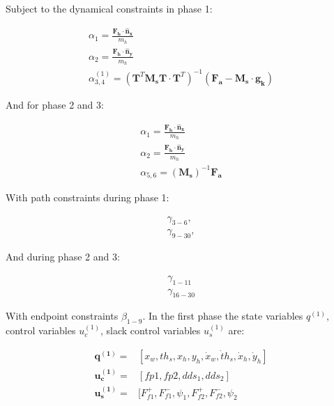 \documentclass[default,iicol]{sn-jnl}
\theoremstyle{thmstyleone}%
\theoremstyle{thmstyletwo}%
\theoremstyle{thmstylethree}%
\begin{document}
Subject to the dynamical constraints in phase 1:

\begin{equation}
\begin{array}{c}
        \alpha_{1} = \frac{\mathbf{F_h}\cdot \mathbf{\hat n_x}}{m_h}\\
        \alpha_{2} = \frac{\mathbf{F_h}\cdot \mathbf{\hat n_y}}{m_h}\\
        \alpha_{3,4}^{(1)} =   \left(\mathbf{T}^T \mathbf{M_s} \mathbf{T} \cdot  \mathbf{T}^T\right)^{-1} (\mathbf{F_a} - \mathbf{M_s} \cdot \mathbf{g_k})
\end{array}
\end{equation}

And for phase 2 and 3:

\begin{equation}
    \begin{array}{c}
        \alpha_{1} = \frac{\mathbf{F_h}\cdot \mathbf{\hat n_x}}{m_h}\\
        \alpha_{2} = \frac{\mathbf{F_h}\cdot \mathbf{\hat n_y}}{m_h}\\ 
        \alpha_{5,6} = (\mathbf{M_s})^{-1}\mathbf{F_a}
    \end{array}
\end{equation}

With path constraints during phase 1:

\begin{equation}
    \begin{array}{c}
         \gamma_{3-6},  \\
         \gamma_{9-30},
    \end{array}
\end{equation}

And during phase 2 and 3:

\begin{equation}
    \begin{array}{c}
         \gamma_{1-11}  \\
         \gamma_{16-30}
    \end{array}
\end{equation}

With endpoint constraints $\beta_{1-9}$.
In the first phase the state variables $q^{(1)}$, control variables $u_c^{(1)}$, slack control variables $u_s^{(1)}$ are:

\begin{equation}
\begin{array}{rl}
   \mathbf{q^{(1)}} =& [x_w , th_s, x_h, y_h, \dot x_w, \dot th_s,\dot x_h, \dot y_h]    \\
   \mathbf{u_c^{(1)}} =& [fp1, fp2, dds_1, dds_2]  \\
   \mathbf{u_s^{(1)}}=&  [F_{f1}^+, F_{f1}^-, \psi_1,F_{f2}^+, F_{f2}^-, \psi_2 
\end{array}
\end{equation}
\end{document}

